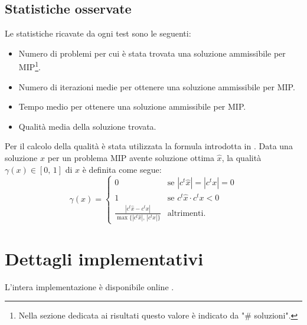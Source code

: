 \subsection{Statistiche osservate}%
\label{sub:Statistiche osservate}
Le statistiche ricavate da ogni test sono le seguenti:
\begin{itemize}
    \item Numero di problemi per cui è stata trovata una soluzione ammissibile
        per MIP\footnote{Nella sezione dedicata ai risultati questo valore è indicato
        da "\# soluzioni".}.
    \item Numero di iterazioni medie per ottenere una soluzione ammissibile per MIP.
    \item Tempo medio per ottenere una soluzione ammissibile per MIP.
    \item Qualità media della soluzione trovata.
\end{itemize}
Per il calcolo della qualità è stata utilizzata la formula introdotta in \cite{acsPaper}.
Data una soluzione $x$ per un problema MIP avente soluzione ottima $\hat x$,
la qualità $\gamma(x)\in [0,\,1]$ di $x$ è definita come segue:
\begin{equation}
    \gamma(x) =
    \begin{cases}
        0 & \text{se } |c^t\hat x| = |c^t x| = 0\\
        1 & \text{se } c^t \hat x \cdot c^t x < 0\\
        \frac{|c^t \hat x - c^t x|}{\max\{|c^t \hat x|,\, |c^t x|\}} & \text{altrimenti.} 
    \end{cases}
\end{equation}

\section{Dettagli implementativi}%
\label{sec:Dettagli implementativi}
L'intera implementazione è disponibile online \cite{repo}.

